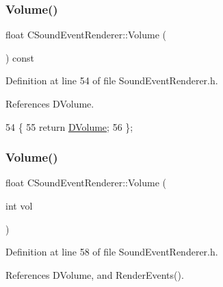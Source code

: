 \subsubsection{\texorpdfstring{Volume()}{Volume()}\hspace{0.1cm}{\footnotesize\ttfamily [1/2]}}
{\footnotesize\ttfamily float C\+Sound\+Event\+Renderer\+::\+Volume (\begin{DoxyParamCaption}{ }\end{DoxyParamCaption}) const\hspace{0.3cm}{\ttfamily [inline]}}



Definition at line 54 of file Sound\+Event\+Renderer.\+h.



References D\+Volume.


\begin{DoxyCode}
54                             \{
55             \textcolor{keywordflow}{return} \hyperlink{classCSoundEventRenderer_a3812aeb93aef90635a7da72fc101c686}{DVolume};
56         \};
\end{DoxyCode}
\hypertarget{classCSoundEventRenderer_a7266c3416291f3802d6f3476a29285a2}{}\label{classCSoundEventRenderer_a7266c3416291f3802d6f3476a29285a2} 
\subsubsection{\texorpdfstring{Volume()}{Volume()}\hspace{0.1cm}{\footnotesize\ttfamily [2/2]}}
{\footnotesize\ttfamily float C\+Sound\+Event\+Renderer\+::\+Volume (\begin{DoxyParamCaption}\item[{int}]{vol }\end{DoxyParamCaption})\hspace{0.3cm}{\ttfamily [inline]}}



Definition at line 58 of file Sound\+Event\+Renderer.\+h.



References D\+Volume, and Render\+Events().



